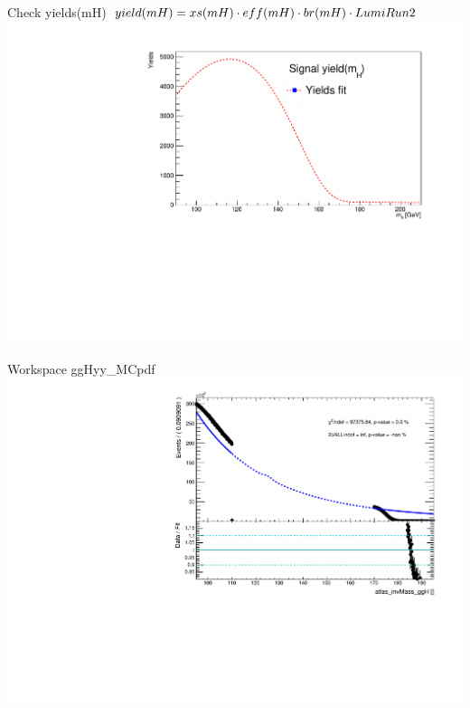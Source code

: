 \documentclass[10pt,UKenglish, leqno, xcolor = dvipsnames]{beamer}
\begin{document}
		\begin{frame}{Check yields(mH)}
			\vfill
			\centering
			$yield(mH) = x\-s(mH) \cdot eff(mH) \cdot br(mH) \cdot LumiRun2$
			\vspace{.5cm}
			\includegraphics[width=.9\textwidth]{../images/check_yields.pdf}
			\vfill
		\end{frame}
	
		\begin{frame}{Workspace ggHyy\_MCpdf}
			\vfill
			\includegraphics[width=1.\textwidth]{../images/ggHyy_MCpdf.pdf}
			\vfill
		\end{frame}
	
\end{document}
